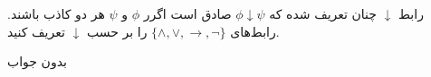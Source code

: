 رابط $\downarrow$ چنان تعریف شده که $\phi\downarrow\psi$ صادق است اگرر $\phi$ و $\psi$ هر دو کاذب باشند. رابط‌های
$\{\wedge,\vee,\to,\neg\}$
را بر حسب $\downarrow$ تعریف کنید.
\begin{ans}
بدون جواب
\end{ans}
